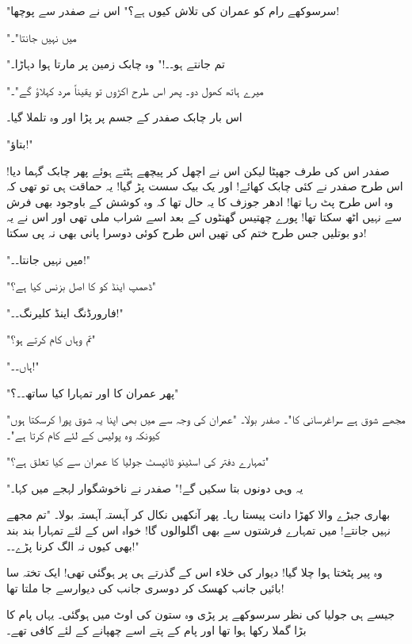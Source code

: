 "سرسوکھے رام کو عمران کی تلاش کیوں ہے؟" اس نے صفدر سے پوچھا!

"میں نہیں جانتا"۔

"تم جانتے ہو۔۔!" وہ چابک زمین پر مارتا ہوا دہاڑا۔

"میرے ہاتھ کھول دو۔ پھر اس طرح اکڑوں تو یقیناً مرد کہلاؤ گے"۔

اس بار چابک صفدر کے جسم پر پڑا اور وہ تلملا گیا۔

"بتاؤ!"

صفدر اس کی طرف جھپٹا لیکن اس نے اچھل کر پیچھے ہٹتے ہوئے پھر چابک گہما دیا! اس طرح صفدر نے کئی چابک کھائے! اور یک بیک سست پڑ گیا! یہ حماقت ہی تو تھی کہ وہ اس طرح پٹ رہا تھا! ادھر جوزف کا یہ حال تھا کہ وہ کوشش کے باوجود بھی فرش سے نہیں اٹھ سکتا تھا! پورے چھتیس گھنٹوں کے بعد اسے شراب ملی تھی اور اس نے یہ دو بوتلیں جس طرح ختم کی تھیں اس طرح کوئی دوسرا پانی بھی نہ پی سکتا!

"میں نہیں جانتا۔۔!"

"ڈھمپ اینڈ کو کا اصل بزنس کیا ہے؟"

"فارورڈنگ اینڈ کلیرنگ۔۔!"

"تم وہاں کام کرتے ہو؟"

"ہاں۔۔!"

"پھر عمران کا اور تمہارا کیا ساتھ۔۔؟"

"مجھے شوق ہے سراغرسانی کا"۔ صفدر بولا۔ "عمران کی وجہ سے میں بھی اپنا یہ شوق پورا کرسکتا ہوں کیونکہ وہ پولیس کے لئے کام کرتا ہے"۔

"تمہارے دفتر کی اسٹینو ٹائپسٹ جولیا کا عمران سے کیا تعلق ہے؟"

"یہ وہی دونوں بتا سکیں گے!" صفدر نے ناخوشگوار لہجے میں کہا۔

بھاری جبڑے والا کھڑا دانت پیستا رہا۔ پھر آنکھیں نکال کر آہستہ آہستہ بولا۔ "تم مجھے نہیں جانتے! میں تمہارے فرشتوں سے بھی اگلوالوں گا! خواہ اس کے لئے تمہارا بند بند بھی کیوں نہ الگ کرنا پڑے۔۔!"

وہ پیر پٹختا ہوا چلا گیا! دیوار کی خلاء اس کے گذرتے ہی پر ہوگئی تھی! ایک تختہ سا بائیں جانب کھسک کر دوسری جانب کی دیوارسے جا ملتا تھا!




\endR

\bigskip\bigskip\bigskip

\centerline{}
\bigskip\bigskip\bigskip
\beginR
\body



جیسے ہی جولیا کی نظر سرسوکھے پر پڑی وہ ستون کی اوٹ میں ہوگئی۔ یہاں پام کا بڑا گملا رکھا ہوا تھا اور پام کے پتے اسے چھپانے کے لئے کافی تھے۔

